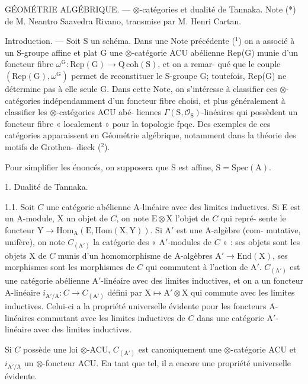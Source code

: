 \documentclass[11pt]{article}
\begin{document}
GÉOMÉTRIE ALGÉBRIQUE. --- $\otimes$-catégories et dualité de Tannaka.
Note (*) de M. Neantro Saavedra Rivano, transmise par M. Henri
Cartan.

Introduction. --- Soit S un schéma. Dans une Note précédente (${}^{1}$)
on a associé à un S-groupe affine et plat G une $\otimes$-catégorie ACU abélienne
Rep(G) munie d'un foncteur fibre $\omega^{\mathrm{G}} : \mathrm{Rep}(\mathrm{G}) \to \mathrm{Q\,coh}(\mathrm{S})$, et on a remar-%
qué que le couple $(\mathrm{Rep}(\mathrm{G}), \omega^{\mathrm{G}})$ permet de reconstituer le S-groupe G;
toutefois, Rep(G) ne détermine pas à elle seule G. Dans cette Note, on
s'intéresse à classifier ces $\otimes$-catégories indépendamment d'un foncteur
fibre choisi, et plus généralement à classifier les $\otimes$-catégories ACU abé-%
liennes $\Gamma(\mathrm{S}, \mathcal{O}_{\mathrm{S}})$-linéaires qui possèdent un foncteur fibre « localement »
pour la topologie fpqc. Des exemples de ces catégories apparaissent en
Géométrie algébrique, notamment dans la théorie des motifs de Grothen-%
dieck (${}^{2}$).

Pour simplifier les énoncés, on supposera que S est affine, $\mathrm{S} = \mathrm{Spec}(\mathrm{A})$.

1. Dualité de Tannaka.

1.1. Soit $C$ une catégorie abélienne A-linéaire avec des limites inductives.
Si E est un A-module, X un objet de $C$, on note $\mathrm{E} \otimes \mathrm{X}$ l'objet de $C$ qui repré-%
sente le foncteur $\mathrm{Y} \to \mathrm{Hom}_{\mathrm{A}}(\mathrm{E}, \mathrm{Hom}(\mathrm{X}, \mathrm{Y}))$. Si A$'$ est une A-algèbre (com-%
mutative, unifère), on note $C_{(\mathrm{A}')}$ la catégorie des « A$'$-modules de $C$ » : ses
objets sont les objets X de $C$ munis d'un homomorphisme de A-algèbres
$\mathrm{A}' \to \mathrm{End}(\mathrm{X})$, ses morphismes sont les morphismes de $C$ qui commutent
à l'action de A$'$. $C_{(\mathrm{A}')}$ est une catégorie abélienne A$'$-linéaire avec des limites
inductives, et on a un foncteur A-linéaire $i_{\mathrm{A}'/\mathrm{A}} : C \to C_{(\mathrm{A}')}$ défini par
$\mathrm{X} \mapsto \mathrm{A}' \otimes \mathrm{X}$ qui commute avec les limites inductives. Celui-ci a la propriété
universelle évidente pour les foncteurs A-linéaires commutant avec les
limites inductives de $C$ dans une catégorie A$'$-linéaire avec des limites
inductives.

Si $C$ possède une loi $\otimes$-ACU, $C_{(\mathrm{A}')}$ est canoniquement une $\otimes$-catégorie
ACU et $i_{\mathrm{A}'/\mathrm{A}}$ un $\otimes$-foncteur ACU. En tant que tel, il a encore une propriété
universelle évidente.
\end{document}
